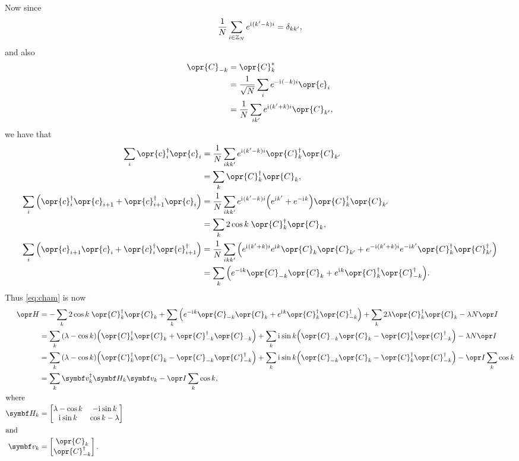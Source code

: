 \documentclass[../thesis.tex]{subfiles}
\begin{document}
Now since
\begin{equation}
  \frac{1}{N}\sum_{i\in\mathbb{Z}_N} e^{\mathrm{i}\mkern1mu(k' - k) i}
  = \delta_{kk'},
\end{equation}
and also
\begin{align}
  \opr{C}_{-k}
  &= \opr{C}_k^* \\
  &= \frac{1}{\sqrt{N}} \sum_i e^{-\im (-k)i} \opr{c}_i \\
  &= \frac{1}{N}\sum_{ik'} e^{\im (k' + k)i} \opr{C}_{k'},
\end{align}
we have that
\begin{align}
  \sum_i \opr{c}_i^\dag\opr{c}_i
  &= \frac{1}{N}\sum_{ikk'} e^{\im (k' - k)i}
  \opr{C}_k^\dag \opr{C}_{k'} \\
  &= \sum_k \opr{C}_k^\dag \opr{C}_k,
  \\
  \sum_i \qty(\opr{c}_i^\dag\opr{c}_{i+1} + \opr{c}_{i+1}^\dag\opr{c}_i)
  &= \frac{1}{N}\sum_{ikk'} e^{\im (k' - k)i} \qty(%
  e^{\im k'} + e^{-\im k} 
  ) \opr{C}_k^\dag \opr{C}_{k'} \\
  &= \sum_k 2 \cos k\; \opr{C}_k^\dag \opr{C}_k,
  \\
  \sum_i \qty(\opr{c}_{i+1}\opr{c}_i + \opr{c}_i^\dag\opr{c}_{i+1}^\dag)
  &= \frac{1}{N}\sum_{ikk'} \qty(%
  e^{\im (k' + k)i} e^{\im k} \opr{C}_{k}\opr{C}_{k'}
  + e^{-\im (k' + k)i} e^{-\im k'} \opr{C}_{k}^\dag\opr{C}_{k'}^\dag
  ) \\
  &= \sum_k \qty(%
  e^{-\im k} \opr{C}_{-k} \opr{C}_k
  + e^{\im k} \opr{C}_k^\dag \opr{C}_{-k}^\dag
  ).
\end{align}
Thus \cref{eq:cham} is now
\begin{align}
  \ham
  &= -\sum_k 2 \cos k\; \opr{C}_k^\dag \opr{C}_k
  + \sum_k \qty(%
  e^{-\im k} \opr{C}_{-k} \opr{C}_k
  + e^{\im k} \opr{C}_k^\dag \opr{C}_{-k}^\dag
  )
  + \sum_k 2\lambda\opr{C}_k^\dag\opr{C}_k
  - \lambda N \idopr
  \\
  &= \sum_k \qty(\lambda - \cos k)
  \qty(%
  \opr{C}_k^\dag \opr{C}_k
  + \opr{C}_{-k}^\dag \opr{C}_{-k}
  )
  + \sum_k \im\sin k
  \qty(%
  \opr{C}_{-k}\opr{C}_k
  - \opr{C}_k^\dag\opr{C}_{-k}^\dag
  )
  - \lambda N \idopr
  \\
  &= \sum_k \qty(\lambda - \cos k)
  \qty(%
  \opr{C}_k^\dag \opr{C}_k
  - \opr{C}_{-k} \opr{C}_{-k}^\dag
  )
  + \sum_k \im\sin k
  \qty(%
  \opr{C}_{-k}\opr{C}_k
  - \opr{C}_k^\dag\opr{C}_{-k}^\dag
  )
  - \idopr\sum_k \cos k
  \\
  &= \sum_k \vq{v}_k^\dag \mq{H}_k \vq{v}_k
  - \idopr\sum_k \cos k,
  \label{eq:Cham} \\
  \shortintertext{where}
  \mq{H}_k
  &= \bmqty{%
  \lambda - \cos k & -\im\sin k \\
  \im\sin k & \cos k - \lambda
  } \\
  \shortintertext{and}
  \vq{v}_k
  &= \bmqty{\opr{C}_k \\ \opr{C}_{-k}^\dag}.
\end{align}
\end{document}

